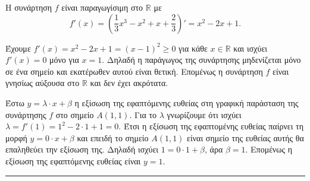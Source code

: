 \begin{alist}
\item Η συνάρτηση $f$ είναι παραγωγίσιμη στο $\mathbb{R}$ με
\[ f'(x) = \left(\frac{1}{3}x^3 - x^2 + x + \frac{2}{3}\right)' = x^2 - 2x + 1. \]

\item Έχουμε $f'(x) = x^2 - 2x + 1 = (x-1)^2 \ge 0$ για κάθε $x \in \mathbb{R}$ και ισχύει $f'(x) = 0$ μόνο για $x=1$. Δηλαδή η παράγωγος της συνάρτησης μηδενίζεται μόνο σε ένα σημείο και εκατέρωθεν αυτού είναι θετική. Επομένως η συνάρτηση $f$ είναι γνησίως αύξουσα στο $\mathbb{R}$ και δεν έχει ακρότατα.

\item Έστω $y = \lambda \cdot x + \beta$ η εξίσωση της εφαπτόμενης ευθείας στη γραφική παράσταση της συνάρτησης $f$ στο σημείο $A(1,1)$. Για το $\lambda$ γνωρίζουμε ότι ισχύει $\lambda = f'(1) = 1^2 - 2 \cdot 1 + 1 = 0$. Έτσι η εξίσωση της εφαπτομένης ευθείας παίρνει τη μορφή $y = 0 \cdot x + \beta$ και επειδή το σημείο $A(1,1)$ είναι σημείο της ευθείας αυτής θα επαληθεύει την εξίσωση της. Δηλαδή ισχύει $1 = 0 \cdot 1 + \beta$, άρα $\beta = 1$. Επομένως η εξίσωση της εφαπτόμενης ευθείας είναι $y = 1$.
\end{alist}
\vspace{6mm}
\noindent\rule{\textwidth}{0.4pt}
\vspace{6mm}

